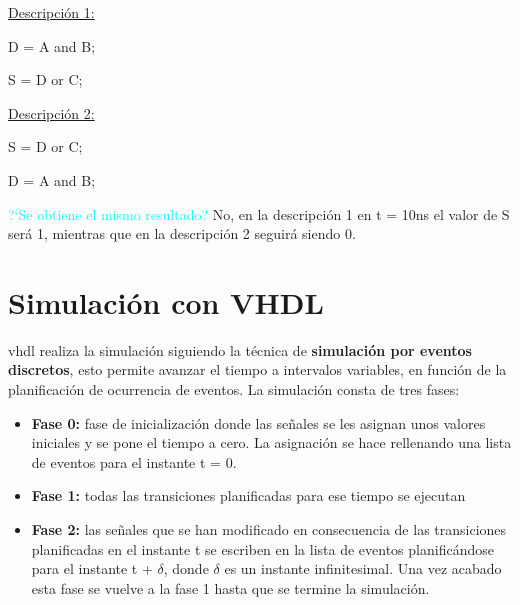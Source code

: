 \begin{multicols}{2}
	\underline{Descripción 1:}

	D = A and B;

	S = D or C;

	\columnbreak

	\underline{Descripción 2:}

	S = D or C;

	D = A and B;
\end{multicols}

\textcolor{cyan}{?`Se obtiene el mismo resultado?} No, en la descripción 1 en t = 10ns el valor de S será 1, mientras que en la descripción 2 seguirá siendo 0.


\newpage
\section{Simulación con VHDL}
\gls{vhdl} realiza la simulación siguiendo la técnica de \textbf{simulación por eventos discretos}, esto permite avanzar el tiempo a intervalos variables, en función de la planificación de ocurrencia de eventos.
La simulación consta de tres fases:
\begin{itemize}
	\item\textbf{Fase 0: }fase de inicialización donde las señales se les asignan unos valores iniciales y se pone el tiempo a cero. La asignación se hace rellenando una lista de eventos para el instante t = 0.
	\item\textbf{Fase 1: }todas las transiciones planificadas para ese tiempo se ejecutan
	\item\textbf{Fase 2: }las señales que se han modificado en consecuencia de las transiciones planificadas en el instante t se escriben en la lista de eventos planificándose para el instante t + $\delta$, donde $\delta$ es un instante infinitesimal. Una vez acabado esta fase se vuelve a la fase 1 hasta que se termine la simulación.
\end{itemize}

